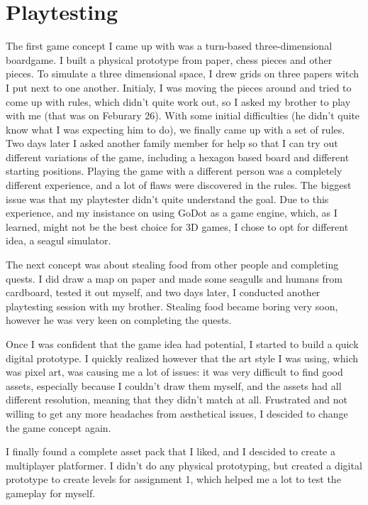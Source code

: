 \documentclass{article}
\begin{document}
\section{Playtesting}
The first game concept I came up with was a turn-based three-dimensional boardgame. I built a physical prototype from paper, chess pieces and other pieces. To simulate a three dimensional space, I drew grids on three papers witch I put next to one another. Initialy, I was moving the pieces around and tried to come up with rules, which didn't quite work out, so I asked my brother to play with me (that was on Feburary 26). With some initial difficulties (he didn't quite know what I was expecting him to do), we finally came up with a set of rules. Two days later I asked another family member for help so that I can try out different variations of the game, including a hexagon based board and different starting positions. Playing the game with a different person was a completely different experience, and a lot of flaws were discovered in the rules. The biggest issue was that my playtester didn't quite understand the goal. Due to this experience, and my insistance on using GoDot as a game engine, which, as I learned, might not be the best choice for 3D games, I chose to opt for different idea, a seagul simulator.

\bigskip
The next concept was about stealing food from other people and completing quests. I did draw a map on paper and made some seagulls and humans from cardboard, tested it out myself, and two days later, I conducted another playtesting session with my brother. Stealing food became boring very soon, however he was very keen on completing the quests. 

Once I was confident that the game idea had potential, I started to build a quick digital prototype. I quickly realized however that the art style I was using, which was pixel art, was causing me a lot of issues: it was very difficult to find good assets, especially because I couldn't draw them myself, and the assets had all different resolution, meaning that they didn't match at all. Frustrated and not willing to get any more headaches from aesthetical issues, I descided to change the game concept again.

\bigskip
I finally found a complete asset pack that I liked, and I descided to create a multiplayer platformer. I didn't do any physical prototyping, but created a digital prototype to create levels for assignment 1, which helped me a lot to test the gameplay for myself. 
\end{document}
